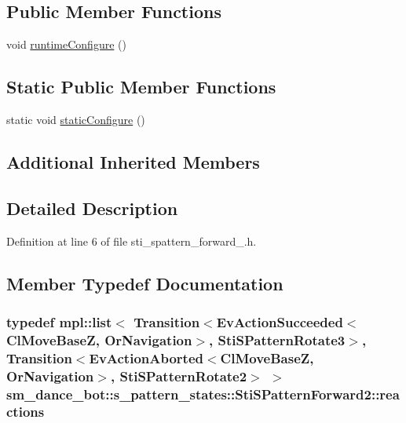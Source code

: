 \subsection*{Public Member Functions}
\begin{DoxyCompactItemize}
\item 
void \hyperlink{structsm__dance__bot_1_1s__pattern__states_1_1StiSPatternForward2_ad3ae0dc24f78ccdf564f77ce7d9d3afe}{runtime\+Configure} ()
\end{DoxyCompactItemize}
\subsection*{Static Public Member Functions}
\begin{DoxyCompactItemize}
\item 
static void \hyperlink{structsm__dance__bot_1_1s__pattern__states_1_1StiSPatternForward2_a33640741652be87e2fcb2758e33e6039}{static\+Configure} ()
\end{DoxyCompactItemize}
\subsection*{Additional Inherited Members}


\subsection{Detailed Description}


Definition at line 6 of file sti\+\_\+spattern\+\_\+forward\+\_.\+h.



\subsection{Member Typedef Documentation}
\subsubsection[{\texorpdfstring{reactions}{reactions}}]{\setlength{\rightskip}{0pt plus 5cm}typedef mpl\+::list$<$ Transition$<${\bf Ev\+Action\+Succeeded}$<${\bf Cl\+Move\+BaseZ}, {\bf Or\+Navigation}$>$, {\bf Sti\+S\+Pattern\+Rotate3}$>$, Transition$<${\bf Ev\+Action\+Aborted}$<${\bf Cl\+Move\+BaseZ}, {\bf Or\+Navigation}$>$, {\bf Sti\+S\+Pattern\+Rotate2}$>$ $>$ {\bf sm\+\_\+dance\+\_\+bot\+::s\+\_\+pattern\+\_\+states\+::\+Sti\+S\+Pattern\+Forward2\+::reactions}}\hypertarget{structsm__dance__bot_1_1s__pattern__states_1_1StiSPatternForward2_a011ca35b5117f84d48e426d04ef9ae9f}{}\label{structsm__dance__bot_1_1s__pattern__states_1_1StiSPatternForward2_a011ca35b5117f84d48e426d04ef9ae9f}


